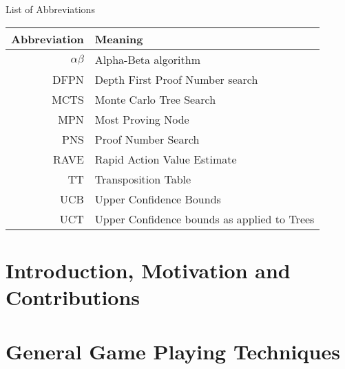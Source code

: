 \documentclass[12pt, letterpaper]{report}
\numberwithin{equation}{section}
\begin{document}
  \section*{}
  \begin{flushright}
    \huge{List of Abbreviations}
  \end{flushright}
  \vspace{0.4in}
  \begin{center}
    \begin{tabular}{rl}
      Abbreviation & Meaning \\
      \hline
      $\alpha\beta$ & Alpha-Beta algorithm \\
      DFPN          & Depth First Proof Number search \\
      MCTS          & Monte Carlo Tree Search \\
      MPN           & Most Proving Node \\
      PNS           & Proof Number Search \\
      RAVE          & Rapid Action Value Estimate \\
      TT            & Transposition Table \\
      UCB           & Upper Confidence Bounds \\
      UCT           & Upper Confidence bounds as applied to Trees \\

    \end{tabular}
  \end{center}  
  
  
  

  \newpage
  \setcounter{page}{1}

  \chapter[Introduction]{\label{intro} \LARGE Introduction, Motivation and Contributions}
  

  \chapter[Background]{\label{background} \LARGE General Game Playing Techniques}
  
\end{document}
